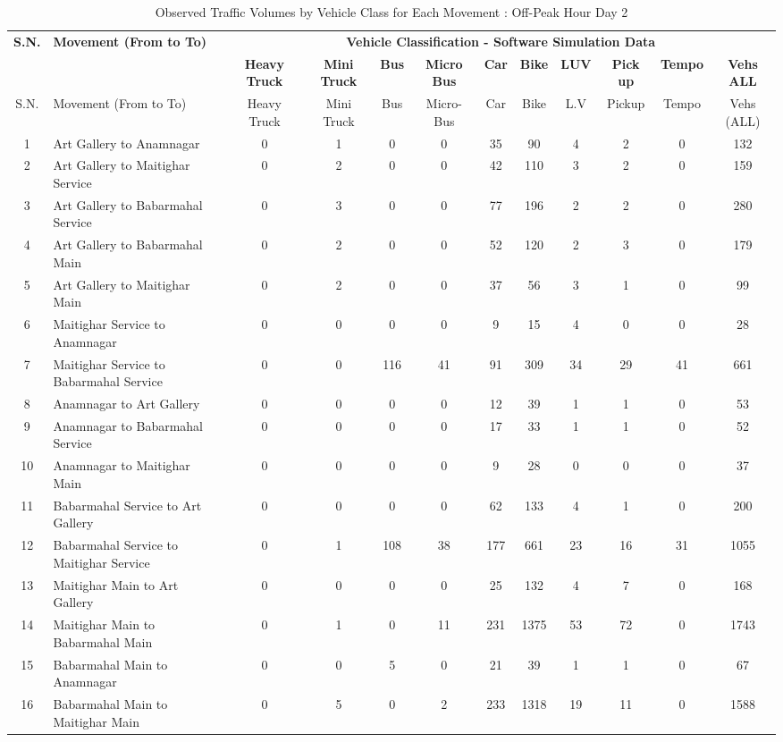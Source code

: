 \begin{landscape}
\begin{table}[h]
\centering
\caption{Observed Traffic Volumes by Vehicle Class for Each Movement : Off-Peak Hour Day 2}
\small
\setlength{\tabcolsep}{5pt}

\begin{tabular}{|c|p{6cm}|c|c|c|c|c|c|c|c|c|c|}
\hline
\textbf{S.N.} & \textbf{Movement (From to To)} & \multicolumn{10}{c|}{\textbf{Vehicle Classification - Software Simulation Data}} \\
\cline{3-12}
& & \textbf{Heavy Truck} & \textbf{Mini Truck} & \textbf{Bus} & \textbf{Micro Bus} & \textbf{Car} & \textbf{Bike} & \textbf{LUV} & \textbf{Pick up} & \textbf{Tempo} & \textbf{Vehs ALL} \\
\hline
S.N. & Movement (From to To) & Heavy Truck & Mini Truck & Bus & Micro-Bus & Car & Bike & L.V & Pickup & Tempo & Vehs (ALL) \\
\hline
1 & Art Gallery to Anamnagar & 0 & 1 & 0 & 0 & 35 & 90 & 4 & 2 & 0 & 132 \\
\hline
2 & Art Gallery to Maitighar Service & 0 & 2 & 0 & 0 & 42 & 110 & 3 & 2 & 0 & 159 \\
\hline
3 & Art Gallery to Babarmahal Service & 0 & 3 & 0 & 0 & 77 & 196 & 2 & 2 & 0 & 280 \\
\hline
4 & Art Gallery to Babarmahal Main & 0 & 2 & 0 & 0 & 52 & 120 & 2 & 3 & 0 & 179 \\
\hline
5 & Art Gallery to Maitighar Main & 0 & 2 & 0 & 0 & 37 & 56 & 3 & 1 & 0 & 99 \\
\hline
6 & Maitighar Service to Anamnagar & 0 & 0 & 0 & 0 & 9 & 15 & 4 & 0 & 0 & 28 \\
\hline
7 & Maitighar Service to Babarmahal Service & 0 & 0 & 116 & 41 & 91 & 309 & 34 & 29 & 41 & 661 \\
\hline
8 & Anamnagar to Art Gallery & 0 & 0 & 0 & 0 & 12 & 39 & 1 & 1 & 0 & 53 \\
\hline
9 & Anamnagar to Babarmahal Service & 0 & 0 & 0 & 0 & 17 & 33 & 1 & 1 & 0 & 52 \\
\hline
10 & Anamnagar to Maitighar Main & 0 & 0 & 0 & 0 & 9 & 28 & 0 & 0 & 0 & 37 \\
\hline
11 & Babarmahal Service to Art Gallery & 0 & 0 & 0 & 0 & 62 & 133 & 4 & 1 & 0 & 200 \\
\hline
12 & Babarmahal Service to Maitighar Service & 0 & 1 & 108 & 38 & 177 & 661 & 23 & 16 & 31 & 1055 \\
\hline
13 & Maitighar Main to Art Gallery & 0 & 0 & 0 & 0 & 25 & 132 & 4 & 7 & 0 & 168 \\
\hline
14 & Maitighar Main to Babarmahal Main & 0 & 1 & 0 & 11 & 231 & 1375 & 53 & 72 & 0 & 1743 \\
\hline
15 & Babarmahal Main to Anamnagar & 0 & 0 & 5 & 0 & 21 & 39 & 1 & 1 & 0 & 67 \\
\hline
16 & Babarmahal Main to Maitighar Main & 0 & 5 & 0 & 2 & 233 & 1318 & 19 & 11 & 0 & 1588 \\
\hline

\end{tabular}
\end{table}
\end{landscape}

